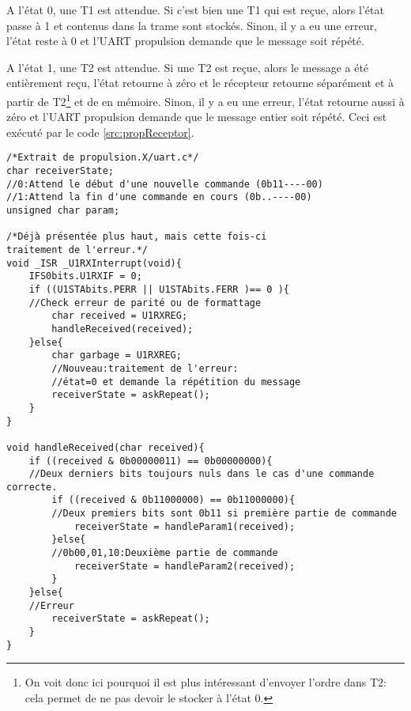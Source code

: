 A l'état 0, une T1 est attendue. Si c'est bien une T1 qui est reçue, alors l'état passe à 1 et  contenus dans la trame sont stockés. Sinon, il y a eu une erreur, l'état reste à 0 et l'UART propulsion demande que le message soit répété.

A l'état 1, une T2 est attendue. Si une T2 est reçue, alors le message a été entièrement reçu, l'état retourne à zéro et le récepteur retourne séparément  et  à partir de T2\footnote{On voit donc ici pourquoi il est plus intéressant d'envoyer l'ordre dans T2: cela permet de ne pas devoir le stocker à l'état 0.} et de  en mémoire. Sinon, il y a eu une erreur, l'état retourne aussi à zéro et l'UART propulsion demande que le message entier soit répété. Ceci est exécuté par le code \ref{src:propReceptor}.
\begin{listing}[htbp]
\begin{verbatim}
/*Extrait de propulsion.X/uart.c*/
char receiverState;
//0:Attend le début d'une nouvelle commande (0b11----00)
//1:Attend la fin d'une commande en cours (0b..----00)
unsigned char param;

/*Déjà présentée plus haut, mais cette fois-ci
traitement de l'erreur.*/
void _ISR _U1RXInterrupt(void){
    IFS0bits.U1RXIF = 0;
    if ((U1STAbits.PERR || U1STAbits.FERR )== 0 ){
    //Check erreur de parité ou de formattage
        char received = U1RXREG;
        handleReceived(received);
    }else{
        char garbage = U1RXREG;
        //Nouveau:traitement de l'erreur:
        //état=0 et demande la répétition du message
        receiverState = askRepeat();
    }
}

void handleReceived(char received){
    if ((received & 0b00000011) == 0b00000000){
    //Deux derniers bits toujours nuls dans le cas d'une commande correcte.
        if ((received & 0b11000000) == 0b11000000){
        //Deux premiers bits sont 0b11 si première partie de commande
            receiverState = handleParam1(received);
        }else{
        //0b00,01,10:Deuxième partie de commande
            receiverState = handleParam2(received);
        }
    }else{
    //Erreur
        receiverState = askRepeat();
    }
}
\end{verbatim}
\end{listing}
\clearpage

